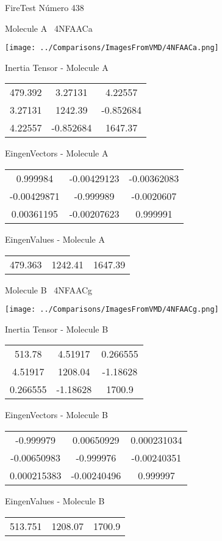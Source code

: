\vtab[-3cm]
\begin{center}
{\large FireTest \tab Número 438}
\end{center}
\begin{multicols}{2}
\begin{center}

Molecule A \
4NFAACa

\texttt{[image: ../Comparisons/ImagesFromVMD/4NFAACa.png]}

Inertia Tensor - Molecule A \\
\begin{tabular}{|c c c|}
479.392	 & 	3.27131	 & 	4.22557	 \\
3.27131	 & 	1242.39	 & 	-0.852684	 \\
4.22557	 & 	-0.852684	 & 	1647.37
\end{tabular}

\vtab
 EingenVectors - Molecule A     \\
\begin{tabular}{|c c c|}
0.999984	 & 	-0.00429123	 & 	-0.00362083	 \\
-0.00429871	 & 	-0.999989	 & 	-0.0020607	 \\
0.00361195	 & 	-0.00207623	 & 	0.999991
\end{tabular}

\vtab
 EingenValues - Molecule A     \\
\begin{tabular}{|c c c|}
479.363	 & 	1242.41	 & 	1647.39	 \\
\end{tabular}
\columnbreak

Molecule B \
4NFAACg

\texttt{[image: ../Comparisons/ImagesFromVMD/4NFAACg.png]}

Inertia Tensor - Molecule B \\
\begin{tabular}{|c c c|}
513.78	 & 	4.51917	 & 	0.266555	 \\
4.51917	 & 	1208.04	 & 	-1.18628	 \\
0.266555	 & 	-1.18628	 & 	1700.9
\end{tabular}

\vtab
 EingenVectors - Molecule B     \\
\begin{tabular}{|c c c|}
-0.999979	 & 	0.00650929	 & 	0.000231034	 \\
-0.00650983	 & 	-0.999976	 & 	-0.00240351	 \\
0.000215383	 & 	-0.00240496	 & 	0.999997
\end{tabular}

\vtab
 EingenValues - Molecule B     \\
\begin{tabular}{|c c c|}
513.751	 & 	1208.07	 & 	1700.9	 \\
\end{tabular}

\end{center}
\end{multicols}

